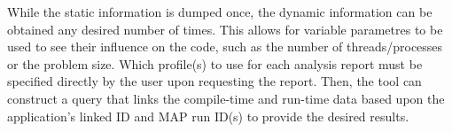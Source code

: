While the static information is dumped once, the dynamic information can be obtained any desired number of times.
This allows for variable parametres to be used to see their influence on the code, such as the number of threads/processes or the problem size.
Which profile(s) to use for each analysis report must be specified directly by the user upon requesting the report.
Then, the tool can construct a query that links the compile-time and run-time data based upon the application's linked ID and MAP run ID(s) to provide the desired results.
